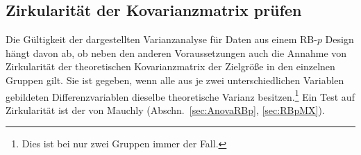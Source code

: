 \subsection{Zirkularität der Kovarianzmatrix prüfen}
\label{sec:sphericity}

Die Gültigkeit der dargestellten Varianzanalyse für Daten aus einem RB-$p$ Design hängt davon ab, ob neben den anderen Voraussetzungen auch die Annahme von Zirkularität der theoretischen Kovarianzmatrix der Zielgröße in den einzelnen Gruppen gilt. Sie ist gegeben, wenn alle aus je zwei unterschiedlichen Variablen gebildeten Differenzvariablen dieselbe theoretische Varianz besitzen.\footnote{Dies ist bei nur zwei Gruppen immer der Fall.} Ein Test auf Zirkularität ist der von Mauchly (Abschn.\ \ref{sec:AnovaRBp}, \ref{sec:RBpMX}).

